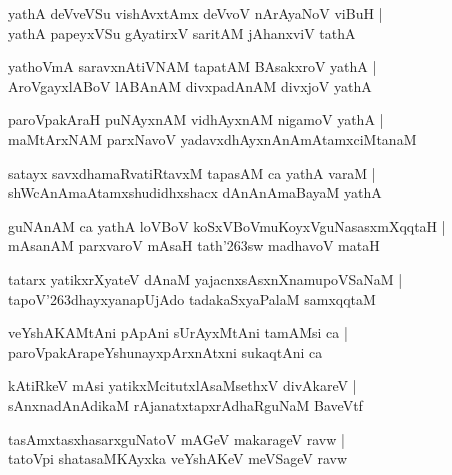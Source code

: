 \documentclass[twoside,12pt,openright]{book}
\def\S{\char'263}
\newcounter{shloka}[chapter]
\begin{document}
\begin{shloka}%
yathA deVveVSu vishAvxtAmx deVvoV nArAyaNoV viBuH |\\
yathA papeyxVSu gAyatirxV saritAM jAhanxviV tathA 
\end{shloka}

\begin{shloka}%
yathoVmA saravxnAtiVNAM tapatAM BAsakxroV yathA |\\
AroVgayxlABoV lABAnAM divxpadAnAM divxjoV yathA 
\end{shloka}

\begin{shloka}%
paroVpakAraH puNAyxnAM vidhAyxnAM nigamoV yathA |\\
maMtArxNAM parxNavoV yadavxdhAyxnAnAmAtamxciMtanaM 
\end{shloka}

\begin{shloka}%
satayx savxdhamaRvatiRtavxM tapasAM ca yathA varaM |\\
shWcAnAmaAtamxshudidhxshacx dAnAnAmaBayaM yathA 
\end{shloka}

\begin{shloka}%
guNAnAM ca yathA loVBoV koSxVBoVmuKoyxVguNasasxmXqqtaH |\\
mAsanAM parxvaroV mAsaH tath\S sw madhavoV mataH 
\end{shloka}

\begin{shloka}%
tatarx yatikxrXyateV dAnaM yajacnxsAsxnXnamupoVSaNaM |\\
tapoV\S dhayxyanapUjAdo tadakaSxyaPalaM samxqqtaM 
\end{shloka}

\begin{shloka}%
veYshAKAMtAni pApAni sUrAyxMtAni tamAMsi ca |\\
paroVpakArapeYshunayxpArxnAtxni sukaqtAni ca 
\end{shloka}

\begin{shloka}%
kAtiRkeV mAsi yatikxMcitutxlAsaMsethxV divAkareV |\\
sAnxnadAnAdikaM rAjanatxtapxrAdhaRguNaM BaveVtf 
\end{shloka}

\begin{shloka}%
tasAmxtasxhasarxguNatoV mAGeV makarageV ravw |\\
tatoVpi shatasaMKAyxka veYshAKeV meVSageV ravw 
\end{shloka}
\end{document}
